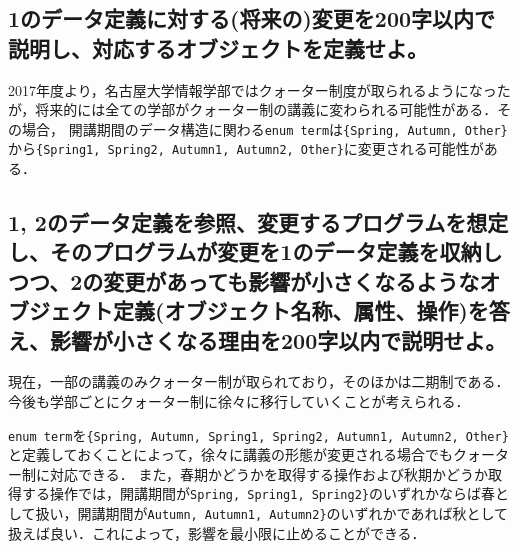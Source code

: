 \documentclass[uplatex]{jsarticle}
\begin{document}
\subsection{1のデータ定義に対する(将来の)変更を200字以内で説明し、対応するオブジェクトを定義せよ。}
2017年度より，名古屋大学情報学部ではクォーター制度が取られるようになったが，将来的には全ての学部がクォーター制の講義に変わられる可能性がある．その場合，
開講期間のデータ構造に関わる\verb#enum term#は\verb#{Spring, Autumn, Other}#から\verb#{Spring1, Spring2, Autumn1, Autumn2, Other}#に変更される可能性がある．
\subsection{1, 2のデータ定義を参照、変更するプログラムを想定し、そのプログラムが変更を1のデータ定義を収納しつつ、2の変更があっても影響が小さくなるようなオブジェクト定義(オブジェクト名称、属性、操作)を答え、影響が小さくなる理由を200字以内で説明せよ。}
現在，一部の講義のみクォーター制が取られており，そのほかは二期制である．今後も学部ごとにクォーター制に徐々に移行していくことが考えられる．

\verb#enum term#を\verb#{Spring, Autumn, Spring1, Spring2, Autumn1, Autumn2, Other}#と定義しておくことによって，徐々に講義の形態が変更される場合でもクォーター制に対応できる．
また，春期かどうかを取得する操作および秋期かどうか取得する操作では，開講期間が\verb#Spring, Spring1, Spring2}#のいずれかならば春として扱い，開講期間が\verb#Autumn, Autumn1, Autumn2}#のいずれかであれば秋として扱えば良い．これによって，影響を最小限に止めることができる．
\end{document}
